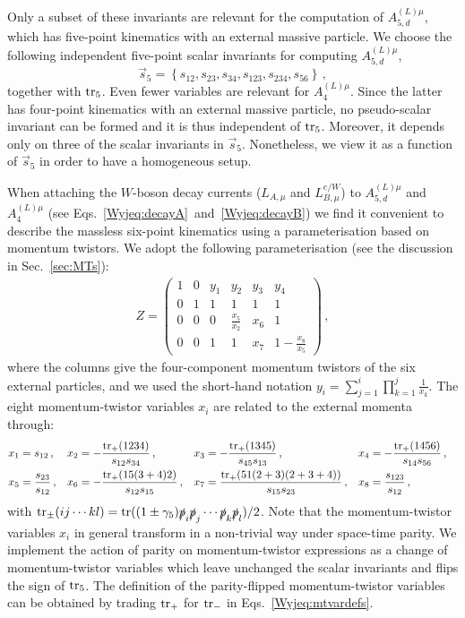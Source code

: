 \documentclass[main.tex]{subfiles}
\begin{document}
Only a subset of these invariants are relevant for the computation of $A_{5,d}^{(L)\mu}$, which has five-point kinematics with an external massive particle. We choose the following independent five-point scalar invariants for computing $A_{5,d}^{(L)\mu}$,
\begin{equation}
\vec{s}_{5} = \left\{ s_{12},s_{23},s_{34},s_{123},s_{234},s_{56}\right\} \,,
\label{Wyjeq:sijs5pt}
\end{equation}
together with $\operatorname{\rm tr}_5$. Even fewer variables are relevant for $A_{4}^{(L)\mu}$. Since the latter has four-point kinematics with an external massive particle, no pseudo-scalar invariant can be formed and it is thus independent of $\operatorname{\rm tr}_5$. Moreover, it depends only on three of the scalar invariants in $\vec{s}_5$. Nonetheless, we view it as a function of $\vec{s}_{5}$ in order to have a homogeneous setup.

When attaching the $W$-boson decay currents ($L_{A,\mu}$ and $L^{e/W}_{B,\mu}$) to $A_{5,d}^{(L)\mu}$ and $A_{4}^{(L)\mu}$ (see Eqs.~\eqref{Wyjeq:decayA}~and~\eqref{Wyjeq:decayB}) we find it convenient to describe the massless six-point kinematics using a parameterisation based on momentum twistors.
We adopt the following parameterisation (see the discussion in Sec.~\ref{sec:MTs}):
\begin{align}
  Z =
  \begin{pmatrix}
    1 & 0 & y_1 & y_2 & y_3 & y_4\\
    0 & 1 & 1   & 1   & 1   & 1 \\
    0 & 0 & 0   & \tfrac{x_5}{x_2} & x_6 & 1 \\
    0 & 0 & 1   & 1   & x_7 & 1-\tfrac{x_8}{x_5}
  \end{pmatrix} \,,
  \label{Wyjeq:ZmatrixW}
\end{align}
where the columns give the four-component momentum twistors of the six external particles, and we used the short-hand notation $y_i = \sum_{j=1}^{i} \prod_{k=1}^{j} \frac{1}{x_k}$. The eight momentum-twistor variables $x_i$ are related to the external momenta through:
\begin{align}
  x_1 &=  s_{12} \,, &
  x_2 &= -\frac{\operatorname{\rm tr}_+(1234)}{s_{12}s_{34}} \,, &
  x_3 &= -\frac{\operatorname{\rm tr}_+(1345)}{s_{45}s_{13}} \,, &
  x_4 &= -\frac{\operatorname{\rm tr}_+(1456)}{s_{14}s_{56}} \,, \nonumber \\
  x_5 &=  \frac{s_{23}}{s_{12}} \,, &
  x_6 &= -\frac{\operatorname{\rm tr}_+(15(3+4)2)}{s_{12}s_{15}} \,, &
  x_7 &=  \frac{\operatorname{\rm tr}_+(51(2+3)(2+3+4))}{s_{15} s_{23}} \,, &
  x_8 &=  \frac{s_{123}}{s_{12}} \,, &
\label{Wyjeq:mtvardefs}
\end{align}
with $\operatorname{\rm tr}_{\pm}(ij \cdots kl) = \operatorname{\rm tr}((1\pm\gamma_5)\slashed{p}_i\slashed{p}_j \cdots\slashed{p}_k\slashed{p}_l)/2$. Note that the momentum-twistor variables $x_i$ in general transform in a non-trivial way under space-time parity. We implement the action of parity on momentum-twistor expressions as a change of momentum-twistor variables which leave unchanged the scalar invariants and flips the sign of $\operatorname{\rm tr}_5$. The definition of the parity-flipped momentum-twistor variables can be obtained by trading $\operatorname{\rm tr}_+$ for $\operatorname{\rm tr}_-$ in Eqs.~\eqref{Wyjeq:mtvardefs}. 
\end{document}
